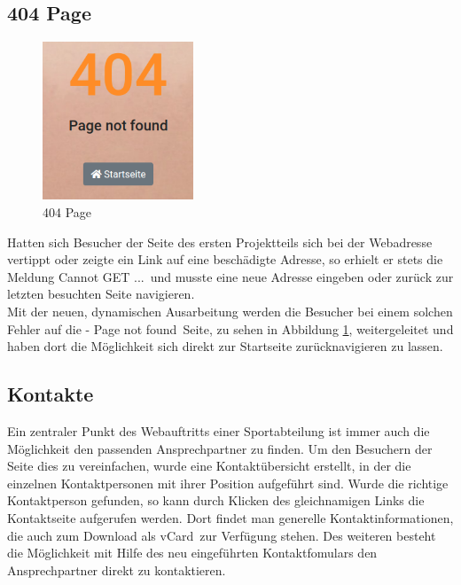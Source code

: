 \documentclass[12pt,a4paper]{article}
\begin{document}
\subsection{404 Page}
\begin{figure}
  \includegraphics[width=4.5cm]{404.png}
  \caption{404 Page}
  \label{img:404}
\end{figure}
Hatten sich Besucher der Seite des ersten Projektteils sich bei der Webadresse vertippt oder zeigte ein Link auf eine beschädigte Adresse, so erhielt er stets die Meldung \glqq Cannot GET ...\grqq \ und musste eine neue Adresse eingeben oder zurück zur letzten besuchten Seite navigieren.\\
Mit der neuen, dynamischen Ausarbeitung werden die Besucher bei einem solchen Fehler auf die  - Page not found\grqq \ Seite, zu sehen in Abbildung \ref{img:404}, weitergeleitet und haben dort die Möglichkeit sich direkt zur Startseite zurücknavigieren zu lassen.

\subsection{Kontakte}
Ein zentraler Punkt des Webauftritts einer Sportabteilung ist immer auch die Möglichkeit den passenden Ansprechpartner zu finden. Um den Besuchern der Seite dies zu vereinfachen, wurde eine Kontaktübersicht erstellt, in der die einzelnen Kontaktpersonen mit ihrer Position aufgeführt sind. Wurde die richtige Kontaktperson gefunden, so kann durch Klicken des gleichnamigen Links die Kontaktseite aufgerufen werden. Dort findet man generelle Kontaktinformationen, die auch zum Download als \glqq vCard\grqq \ zur Verfügung stehen. Des weiteren besteht die Möglichkeit mit Hilfe des neu eingeführten Kontaktfomulars den Ansprechpartner direkt zu kontaktieren.

\newpage
\end{document}
